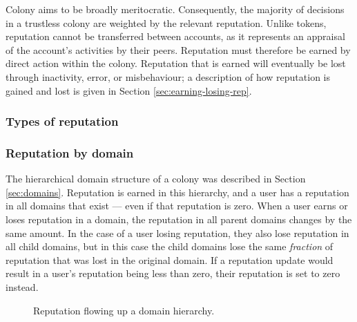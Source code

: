Colony aims to be broadly meritocratic. Consequently, the majority of decisions in a trustless colony are weighted by the relevant reputation. Unlike tokens, reputation cannot be transferred between accounts, as it represents an appraisal of the account's activities by their peers. Reputation must therefore be earned by direct action within the colony. Reputation that is earned will eventually be lost through inactivity, error, or misbehaviour; a description of how reputation is gained and lost is given in Section \ref{sec:earning-losing-rep}.

\subsubsection{Types of reputation}

\subsubsection*{Reputation by domain}\label{sec:rep-by-domain}

The hierarchical domain structure of a colony was described in Section \ref{sec:domains}. Reputation is earned in this hierarchy, and a user has a reputation in all domains that exist --- even if that reputation is zero. When a user earns or loses reputation in a domain, the reputation in all parent domains changes by the same amount. In the case of a user losing reputation, they also lose reputation in all child domains, but in this case the child domains lose the same \textit{fraction} of reputation that was lost in the original domain. If a reputation update would result in a user's reputation being less than zero, their reputation is set to zero instead. \\

\begin{figure}[h]
    \centering
 \caption{Reputation flowing up a domain hierarchy.}
 \label{fig:reputationhierarchysample}
\end{figure}

